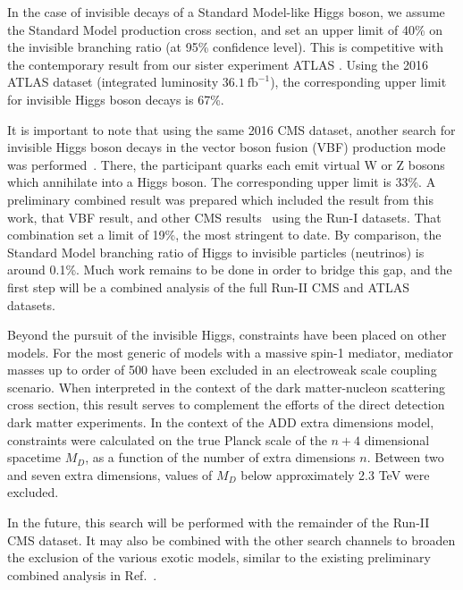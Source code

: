 In the case of invisible decays of a Standard Model-like Higgs boson,
we assume the Standard Model production cross section, and set an upper limit of 40\% on the invisible branching ratio (at 95\% confidence level).
This is competitive with the contemporary result from our sister experiment ATLAS \cite{Aaboud:2017bja}.
Using the 2016 ATLAS dataset (integrated luminosity $36.1~\mathrm{fb}^{-1}$), 
the corresponding upper limit for invisible Higgs boson decays is 67\%.

It is important to note that using the same 2016 CMS dataset,
another search for invisible Higgs boson decays in the vector boson fusion (VBF) production mode was performed~\cite{Sirunyan:2018owy}.
There, the participant quarks each emit virtual W or Z bosons which annihilate into a Higgs boson.
The corresponding upper limit is 33\%.
A preliminary combined result was prepared which included the result from this work, that VBF result, and other CMS results~\cite{Chatrchyan:2014tja} using the Run-I datasets.
That combination set a limit of 19\%, the most stringent to date.
By comparison, the Standard Model branching ratio of Higgs to invisible particles (neutrinos) is around 0.1\%.
Much work remains to be done in order to bridge this gap,
and the first step will be a combined analysis of the full Run-II CMS and ATLAS datasets.

Beyond the pursuit of the invisible Higgs, constraints have been placed on other models.
For the most generic of models with a massive spin-1 mediator,
mediator masses up to order of 500 \GeV have been excluded in an electroweak scale coupling scenario.
When interpreted in the context of the dark matter-nucleon scattering cross section,
this result serves to complement the efforts of the direct detection dark matter experiments.
In the context of the ADD extra dimensions model, constraints were calculated on the true Planck scale of the $n+4$ dimensional spacetime $M_D$, as a function of the number of extra dimensions $n$.
Between two and seven extra dimensions, values of $M_D$ below approximately 2.3 TeV were excluded.

In the future, this search will be performed with the remainder of the Run-II CMS dataset.
It may also be combined with the other search channels to broaden the exclusion
of the various exotic models, similar to the existing preliminary combined analysis
in Ref.~\cite{CMS-PAPER-HIG-16-016}.

